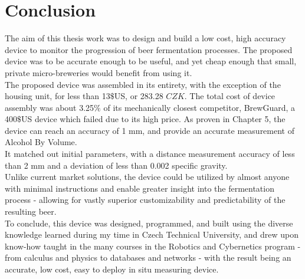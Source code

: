 \documentclass[twoside]{ctuthesis}
\theoremstyle{plain}
\theoremstyle{definition}
\theoremstyle{note}
\begin{document}
\section{Conclusion}
The aim of this thesis work was to design and build a low cost, high accuracy device to monitor the progression of beer fermentation processes. The proposed device was to be accurate enough to be useful, and yet cheap enough that small, private micro-breweries would benefit from using it.\\
The proposed device was assembled in its entirety, with the exception of the housing unit, for less than 13$\$$US, or 283.28 $CZK$. The total cost of device assembly was about 3.25$\%$ of its mechanically closest competitor, BrewGuard, a 400$\$$US device which failed due to its high price. As proven in Chapter 5, the device can reach an accuracy of 1 mm, and provide an accurate measurement of Alcohol By Volume.\\
It matched out initial parameters, with a distance measurement accuracy of less than 2 mm and a deviation of less than 0.002 specific gravity.\\
Unlike current market solutions, the device could be utilized by almost anyone with minimal instructions and enable greater insight into the fermentation process - allowing for vastly superior customizability and predictability of the resulting beer.\\
To conclude, this device was designed, programmed, and built using the diverse knowledge learned during my time in Czech Technical University, and drew upon know-how taught in the many courses in the Robotics and Cybernetics program - from calculus and physics to databases and networks - with the result being an accurate, low cost, easy to deploy in situ measuring device.



\appendix
\end{document}
